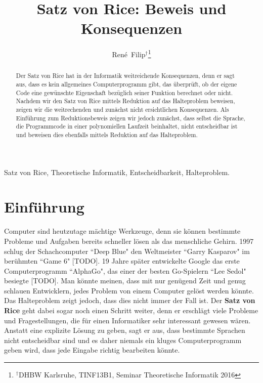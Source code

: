 \documentclass[journal]{IEEEtran}
\begin{document}
\newtheorem{definition}{Definition}
\newtheorem{theorem}[definition]{Satz}
\newtheorem{corollar}[definition]{Korollar}
\newtheorem{example}[definition]{Beispiel}

\renewcommand{\proofname}{Beweis}

\title{Satz von Rice: Beweis und Konsequenzen}


\author{René~Filip$^{\dag}$\thanks{$^{\dag}$DHBW Karlsruhe, TINF13B1, Seminar Theoretische Informatik 2016}}


\maketitle


\begin{abstract}
Der Satz von Rice hat in der Informatik weitreichende Konsequenzen, denn er sagt aus, dass es kein allgemeines Computerprogramm gibt, das überprüft, ob der eigene Code eine gewünschte Eigenschaft bezüglich seiner Funktion berechnet oder nicht. Nachdem wir den Satz von Rice mittels Reduktion auf das Halteproblem beweisen, zeigen wir die weitrechenden und zunächst nicht ersichtlichen Konsequenzen. Als Einführung zum Reduktionsbeweis zeigen wir jedoch zunächst, dass selbst die Sprache, die Programmcode in einer polynomiellen Laufzeit beinhaltet, nicht entscheidbar ist und beweisen dies ebenfalls mittels Reduktion auf das Halteproblem.
\end{abstract}


\begin{IEEEkeywords}
  Satz von Rice, Theoretische Informatik, Entscheidbarkeit, Halteproblem.
\end{IEEEkeywords}






\section{Einführung}

Computer sind heutzutage mächtige Werkzeuge, denn sie können bestimmte Probleme und Aufgaben bereits schneller lösen als das menschliche Gehirn. 1997 schlug der Schachcomputer ``Deep Blue" den Weltmeister ``Garry Kasparov" im berühmten ``Game 6" [TODO]. 19 Jahre später entwickelte Google das erste Computerprogramm ``AlphaGo", das einer der besten Go-Spielern ``Lee Sedol" besiegte [TODO]. Man könnte meinen, dass mit nur genügend Zeit und genug schlauen Entwicklern, jedes Problem von einem Computer gelöst werden könnte. Das Halteproblem zeigt jedoch, dass dies nicht immer der Fall ist. Der \textbf{Satz von Rice} geht dabei sogar noch einen Schritt weiter, denn er erschlägt viele Probleme und Fragestellungen, die für einen Informatiker sehr interessant gewesen wären. Anstatt eine explizite Lösung zu geben, sagt er aus, dass bestimmte Sprachen nicht entscheidbar sind und es daher niemals ein kluges Computerprogramm geben wird, dass jede Eingabe richtig bearbeiten könnte.
\end{document}
